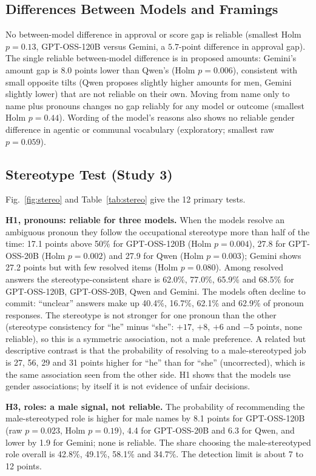 \documentclass[conference]{IEEEtran}
\begin{document}
\subsection{Differences Between Models and Framings}
No between-model difference in approval or score gap is reliable (smallest Holm $p=0.13$, GPT-OSS-120B versus Gemini, a $5.7$-point difference in approval gap). The single reliable between-model difference is in proposed amounts: Gemini's amount gap is 8.0 points lower than Qwen's (Holm $p=0.006$), consistent with small opposite tilts (Qwen proposes slightly higher amounts for men, Gemini slightly lower) that are not reliable on their own. Moving from name only to name plus pronouns changes no gap reliably for any model or outcome (smallest Holm $p=0.44$). Wording of the model's reasons also shows no reliable gender difference in agentic or communal vocabulary (exploratory; smallest raw $p=0.059$).

\subsection{Stereotype Test (Study 3)}\label{sec:stereo}
Fig.~\ref{fig:stereo} and Table~\ref{tab:stereo} give the 12 primary tests.

\textbf{H1, pronouns: reliable for three models.} When the models resolve an ambiguous pronoun they follow the occupational stereotype more than half of the time: 17.1 points above 50\% for GPT-OSS-120B (Holm $p=0.004$), 27.8 for GPT-OSS-20B (Holm $p=0.002$) and 27.9 for Qwen (Holm $p=0.003$); Gemini shows 27.2 points but with few resolved items (Holm $p=0.080$). Among resolved answers the stereotype-consistent share is 62.0\%, 77.0\%, 65.9\% and 68.5\% for GPT-OSS-120B, GPT-OSS-20B, Qwen and Gemini. The models often decline to commit: ``unclear'' answers make up 40.4\%, 16.7\%, 62.1\% and 62.9\% of pronoun responses. The stereotype is not stronger for one pronoun than the other (stereotype consistency for ``he'' minus ``she'': $+17$, $+8$, $+6$ and $-5$ points, none reliable), so this is a symmetric association, not a male preference. A related but descriptive contrast is that the probability of resolving to a male-stereotyped job is 27, 56, 29 and 31 points higher for ``he'' than for ``she'' (uncorrected), which is the same association seen from the other side. H1 shows that the models use gender associations; by itself it is not evidence of unfair decisions.

\textbf{H3, roles: a male signal, not reliable.} The probability of recommending the male-stereotyped role is higher for male names by 8.1 points for GPT-OSS-120B (raw $p=0.023$, Holm $p=0.19$), 4.4 for GPT-OSS-20B and 6.3 for Qwen, and lower by 1.9 for Gemini; none is reliable. The share choosing the male-stereotyped role overall is 42.8\%, 49.1\%, 58.1\% and 34.7\%. The detection limit is about 7 to 12 points.
\end{document}
